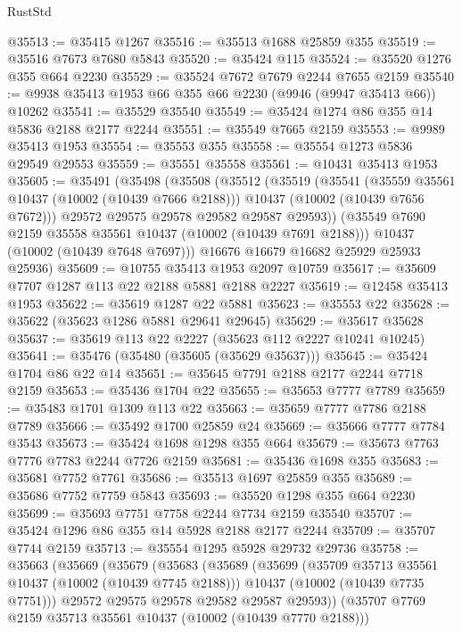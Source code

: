 \begin{lexlean}{RustStd}
\begin{coremodule}
@35513 := @35415 @1267
@35516 := @35513 @1688 @25859 @355
@35519 := @35516 @7673 @7680 @5843
@35520 := @35424 @115
@35524 := @35520 @1276 @355 @664 @2230
@35529 := @35524 @7672 @7679 @2244 @7655 @2159
@35540 := @9938 @35413 @1953 @66 @355 @66 @2230 (@9946 (@9947 @35413 @66)) @10262
@35541 := @35529 @35540
@35549 := @35424 @1274 @86 @355 @14 @5836 @2188 @2177 @2244
@35551 := @35549 @7665 @2159
@35553 := @9989 @35413 @1953
@35554 := @35553 @355
@35558 := @35554 @1273 @5836 @29549 @29553
@35559 := @35551 @35558
@35561 := @10431 @35413 @1953
@35605 := @35491
    (@35498
      (@35508
        (@35512
          (@35519
            (@35541
              (@35559 @35561 @10437 (@10002 (@10439 @7666 @2188)))
              @10437
              (@10002 (@10439 @7656 @7672)))
            @29572
            @29575
            @29578
            @29582
            @29587
            @29593))
        (@35549 @7690 @2159 @35558 @35561 @10437 (@10002 (@10439 @7691 @2188)))
        @10437
        (@10002 (@10439 @7648 @7697)))
      @16676
      @16679
      @16682
      @25929
      @25933
      @25936)
@35609 := @10755 @35413 @1953 @2097 @10759
@35617 := @35609 @7707 @1287 @113 @22 @2188 @5881 @2188 @2227
@35619 := @12458 @35413 @1953
@35622 := @35619 @1287 @22 @5881
@35623 := @35553 @22
@35628 := @35622 (@35623 @1286 @5881 @29641 @29645)
@35629 := @35617 @35628
@35637 := @35619 @113 @22 @2227 (@35623 @112 @2227 @10241 @10245)
@35641 := @35476 (@35480 (@35605 (@35629 @35637)))
@35645 := @35424 @1704 @86 @22 @14
@35651 := @35645 @7791 @2188 @2177 @2244 @7718 @2159
@35653 := @35436 @1704 @22
@35655 := @35653 @7777 @7789
@35659 := @35483 @1701 @1309 @113 @22
@35663 := @35659 @7777 @7786 @2188 @7789
@35666 := @35492 @1700 @25859 @24
@35669 := @35666 @7777 @7784 @3543
@35673 := @35424 @1698 @1298 @355 @664
@35679 := @35673 @7763 @7776 @7783 @2244 @7726 @2159
@35681 := @35436 @1698 @355
@35683 := @35681 @7752 @7761
@35686 := @35513 @1697 @25859 @355
@35689 := @35686 @7752 @7759 @5843
@35693 := @35520 @1298 @355 @664 @2230
@35699 := @35693 @7751 @7758 @2244 @7734 @2159 @35540
@35707 := @35424 @1296 @86 @355 @14 @5928 @2188 @2177 @2244
@35709 := @35707 @7744 @2159
@35713 := @35554 @1295 @5928 @29732 @29736
@35758 := @35663
    (@35669
      (@35679
        (@35683
          (@35689
            (@35699
              (@35709 @35713 @35561 @10437 (@10002 (@10439 @7745 @2188)))
              @10437
              (@10002 (@10439 @7735 @7751)))
            @29572
            @29575
            @29578
            @29582
            @29587
            @29593))
        (@35707 @7769 @2159 @35713 @35561 @10437 (@10002 (@10439 @7770 @2188)))

\end{coremodule}
\end{lexlean}
